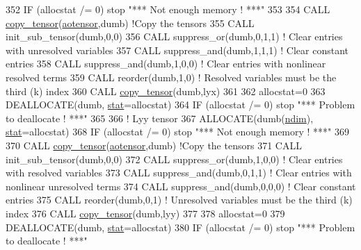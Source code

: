 \begin{DoxyCode}
352     \textcolor{keywordflow}{IF} (allocstat /= 0) stop \textcolor{stringliteral}{"*** Not enough memory ! ***"}
353 
354     \textcolor{keyword}{CALL }\hyperlink{namespacetensor_a4a88ee8077278486c5128ad97617969e}{copy\_tensor}(\hyperlink{namespaceaotensor__def_a0dc43bc9294a18f2fe57b67489f1702f}{aotensor},dumb) \textcolor{comment}{!Copy the tensors}
355     \textcolor{keyword}{CALL }init\_sub\_tensor(dumb,0,0)
356     \textcolor{keyword}{CALL }suppress\_or(dumb,0,1,1) \textcolor{comment}{! Clear entries with unresolved variables}
357     \textcolor{keyword}{CALL }suppress\_and(dumb,1,1,1) \textcolor{comment}{! Clear constant entries}
358     \textcolor{keyword}{CALL }suppress\_and(dumb,1,0,0) \textcolor{comment}{! Clear entries with nonlinear resolved terms}
359     \textcolor{keyword}{CALL }reorder(dumb,1,0) \textcolor{comment}{! Resolved variables must be the third (k) index}
360     \textcolor{keyword}{CALL }\hyperlink{namespacetensor_a4a88ee8077278486c5128ad97617969e}{copy\_tensor}(dumb,lyx)
361 
362     allocstat=0
363     \textcolor{keyword}{DEALLOCATE}(dumb, \hyperlink{namespacestat}{stat}=allocstat)
364     \textcolor{keywordflow}{IF} (allocstat /= 0)  stop \textcolor{stringliteral}{"*** Problem to deallocate ! ***"}
365 
366     \textcolor{comment}{! Lyy tensor}
367     \textcolor{keyword}{ALLOCATE}(dumb(\hyperlink{namespaceparams_a2323fe1773f086e20c14f266351c482b}{ndim}), \hyperlink{namespacestat}{stat}=allocstat)
368     \textcolor{keywordflow}{IF} (allocstat /= 0) stop \textcolor{stringliteral}{"*** Not enough memory ! ***"}
369 
370     \textcolor{keyword}{CALL }\hyperlink{namespacetensor_a4a88ee8077278486c5128ad97617969e}{copy\_tensor}(\hyperlink{namespaceaotensor__def_a0dc43bc9294a18f2fe57b67489f1702f}{aotensor},dumb) \textcolor{comment}{!Copy the tensors}
371     \textcolor{keyword}{CALL }init\_sub\_tensor(dumb,0,0)
372     \textcolor{keyword}{CALL }suppress\_or(dumb,1,0,0) \textcolor{comment}{! Clear entries with resolved variables}
373     \textcolor{keyword}{CALL }suppress\_and(dumb,0,1,1) \textcolor{comment}{! Clear entries with nonlinear unresolved terms}
374     \textcolor{keyword}{CALL }suppress\_and(dumb,0,0,0) \textcolor{comment}{! Clear constant entries}
375     \textcolor{keyword}{CALL }reorder(dumb,0,1) \textcolor{comment}{! Unresolved variables must be the third (k) index}
376     \textcolor{keyword}{CALL }\hyperlink{namespacetensor_a4a88ee8077278486c5128ad97617969e}{copy\_tensor}(dumb,lyy)
377 
378     allocstat=0
379     \textcolor{keyword}{DEALLOCATE}(dumb, \hyperlink{namespacestat}{stat}=allocstat)
380     \textcolor{keywordflow}{IF} (allocstat /= 0)  stop \textcolor{stringliteral}{"*** Problem to deallocate ! ***"}

\end{DoxyCode}
